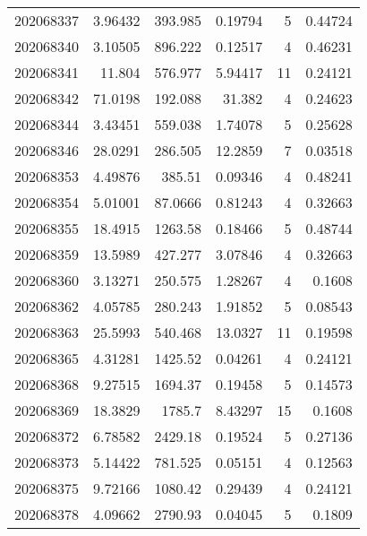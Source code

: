 \begin{tabular}{rrrrrr}
 202068337 &          3.96432 &      393.985  &            0.19794 &           5 & 0.44724 \\
 202068340 &          3.10505 &      896.222  &            0.12517 &           4 & 0.46231 \\
 202068341 &         11.804   &      576.977  &            5.94417 &          11 & 0.24121 \\
 202068342 &         71.0198  &      192.088  &           31.382   &           4 & 0.24623 \\
 202068344 &          3.43451 &      559.038  &            1.74078 &           5 & 0.25628 \\
 202068346 &         28.0291  &      286.505  &           12.2859  &           7 & 0.03518 \\
 202068353 &          4.49876 &      385.51   &            0.09346 &           4 & 0.48241 \\
 202068354 &          5.01001 &       87.0666 &            0.81243 &           4 & 0.32663 \\
 202068355 &         18.4915  &     1263.58   &            0.18466 &           5 & 0.48744 \\
 202068359 &         13.5989  &      427.277  &            3.07846 &           4 & 0.32663 \\
 202068360 &          3.13271 &      250.575  &            1.28267 &           4 & 0.1608  \\
 202068362 &          4.05785 &      280.243  &            1.91852 &           5 & 0.08543 \\
 202068363 &         25.5993  &      540.468  &           13.0327  &          11 & 0.19598 \\
 202068365 &          4.31281 &     1425.52   &            0.04261 &           4 & 0.24121 \\
 202068368 &          9.27515 &     1694.37   &            0.19458 &           5 & 0.14573 \\
 202068369 &         18.3829  &     1785.7    &            8.43297 &          15 & 0.1608  \\
 202068372 &          6.78582 &     2429.18   &            0.19524 &           5 & 0.27136 \\
 202068373 &          5.14422 &      781.525  &            0.05151 &           4 & 0.12563 \\
 202068375 &          9.72166 &     1080.42   &            0.29439 &           4 & 0.24121 \\
 202068378 &          4.09662 &     2790.93   &            0.04045 &           5 & 0.1809  \\

\end{tabular}
